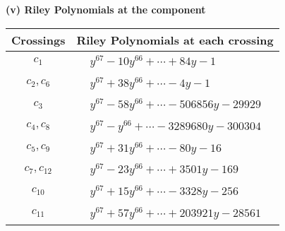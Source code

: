 \documentclass[1p]{elsarticle_modified}
\theoremstyle{definition}
\begin{document}
\newpage\renewcommand{\arraystretch}{1}
\flushleft \textbf{(v) Riley Polynomials at the component}\newline \\
\begin{tabular}{m{50pt}|m{274pt}}
Crossings & \hspace{64pt}Riley Polynomials at each crossing \\
\hline $$\begin{aligned}c_{1}\end{aligned}$$&$\begin{aligned}
&y^{67}-10 y^{66}+\cdots+84 y-1
\end{aligned}$\\
\hline $$\begin{aligned}c_{2},c_{6}\end{aligned}$$&$\begin{aligned}
&y^{67}+38 y^{66}+\cdots-4 y-1
\end{aligned}$\\
\hline $$\begin{aligned}c_{3}\end{aligned}$$&$\begin{aligned}
&y^{67}-58 y^{66}+\cdots-506856 y-29929
\end{aligned}$\\
\hline $$\begin{aligned}c_{4},c_{8}\end{aligned}$$&$\begin{aligned}
&y^{67}- y^{66}+\cdots-3289680 y-300304
\end{aligned}$\\
\hline $$\begin{aligned}c_{5},c_{9}\end{aligned}$$&$\begin{aligned}
&y^{67}+31 y^{66}+\cdots-80 y-16
\end{aligned}$\\
\hline $$\begin{aligned}c_{7},c_{12}\end{aligned}$$&$\begin{aligned}
&y^{67}-23 y^{66}+\cdots+3501 y-169
\end{aligned}$\\
\hline $$\begin{aligned}c_{10}\end{aligned}$$&$\begin{aligned}
&y^{67}+15 y^{66}+\cdots-3328 y-256
\end{aligned}$\\
\hline $$\begin{aligned}c_{11}\end{aligned}$$&$\begin{aligned}
&y^{67}+57 y^{66}+\cdots+203921 y-28561
\end{aligned}$\\
\hline
\end{tabular}\\~\\
\end{document}
